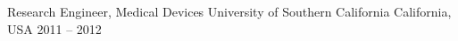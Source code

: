 \cventry
{Research Engineer, Medical Devices}
{University of Southern California}
{California, USA}
{2011 -- 2012}
{}
